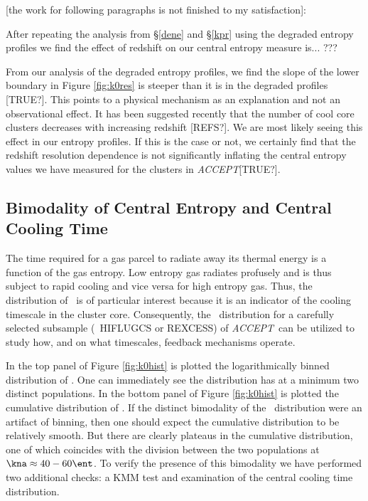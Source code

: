 \documentclass[12pt, preprint]{aastex}
\newcommand{\accept}{\textit{ACCEPT}}
\begin{document}
{{[the work for following paragraphs is not finished to my
satisfaction]:

After repeating the analysis from \S\ref{dene} and \S\ref{kpr} using
the degraded entropy profiles we find the effect of redshift on our
central entropy measure is... ???

From our analysis of the degraded entropy profiles, we find the slope
of the lower boundary in Figure \ref{fig:k0res} is steeper than it is
in the degraded profiles [TRUE?]. This points to a physical
mechanism as an explanation and not an observational effect. It has
been suggested recently that the number of cool core clusters
decreases with increasing redshift [REFS?]. We are most likely seeing
this effect in our entropy profiles. If this is the case or not, we
certainly find that the redshift resolution dependence is not
significantly inflating the central entropy values we have measured
for the clusters in \accept [TRUE?].

\subsection{Bimodality of Central Entropy and Central Cooling Time}
\label{sec:bimod}

The time required for a gas parcel to radiate away its thermal energy
is a function of the gas entropy. Low entropy gas radiates profusely
and is thus subject to rapid cooling and vice versa for high
entropy gas. Thus, the distribution of \kna\ is of particular interest
because it is an indicator of the cooling timescale in the cluster
core. Consequently, the \kna\ distribution for a carefully selected
subsample (\eg\ HIFLUGCS or REXCESS) of \accept\ can be utilized to
study how, and on what timescales, feedback mechanisms operate.

In the top panel of Figure \ref{fig:k0hist} is plotted the
logarithmically binned distribution of \kna. One can immediately see
the distribution has at a minimum two distinct populations. In the
bottom panel of Figure \ref{fig:k0hist} is plotted the cumulative
distribution of \kna. If the distinct bimodality of the \kna\
distribution were an artifact of binning, then one should expect the
cumulative distribution to be relatively smooth. But there are clearly
plateaus in the cumulative distribution, one of which coincides with
the division between the two populations at $\kna \approx 40-60
\ent$. To verify the presence of this bimodality we have performed two
additional checks: a KMM test and examination of the central cooling
time distribution.

}}
\end{document}

